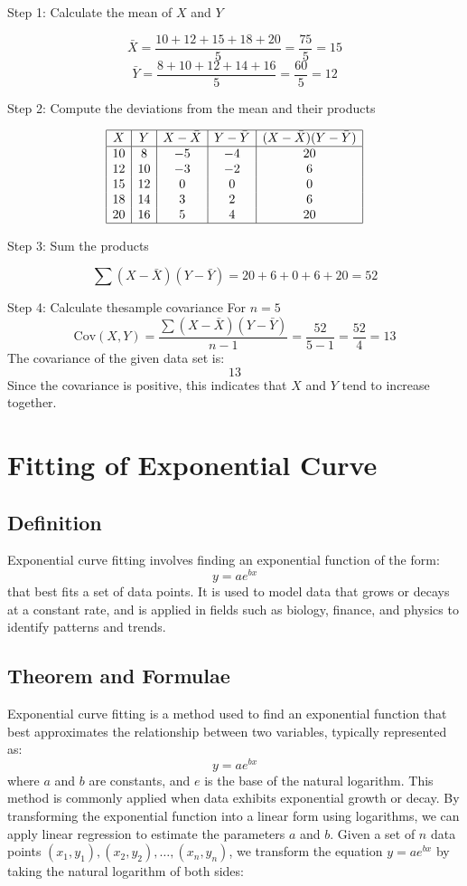 \documentclass[12pt]{article}
\begin{document}
Step 1: Calculate the mean of \(X\) and \(Y\)

\[
\bar{X} = \frac{10 + 12 + 15 + 18 + 20}{5} = \frac{75}{5} = 15
\]
\[
\bar{Y} = \frac{8 + 10 + 12 + 14 + 16}{5} = \frac{60}{5} = 12
\]

Step 2: Compute the deviations from the mean and their products

\[
\begin{array}{|c|c|c|c|c|}
\hline
X & Y & X - \bar{X} & Y - \bar{Y} & (X - \bar{X})(Y - \bar{Y}) \\
\hline
10 & 8  & -5  & -4  & 20 \\
12 & 10 & -3  & -2  & 6 \\
15 & 12 & 0   & 0   & 0 \\
18 & 14 & 3   & 2   & 6 \\
20 & 16 & 5   & 4   & 20 \\
\hline
\end{array}
\]

Step 3: Sum the products

\[
\sum (X - \bar{X})(Y - \bar{Y}) = 20 + 6 + 0 + 6 + 20 = 52
\]

Step 4: Calculate thesample covariance
For \(n = 5\)
\[
\text{Cov}(X, Y) = \frac{\sum (X - \bar{X})(Y - \bar{Y})}{n - 1} = \frac{52}{5 - 1} = \frac{52}{4} = 13
\]
The covariance of the given data set is:
\[
\boxed{13}
\]
Since the covariance is positive, this indicates that \(X\) and \(Y\) tend to increase together.

\section*{Fitting of Exponential Curve}
\subsection*{Definition}
Exponential curve fitting involves finding an exponential function of the form:
\[
y = a e^{bx}
\]
that best fits a set of data points. It is used to model data that grows or decays at a constant rate, and is applied in fields such as biology, finance, and physics to identify patterns and trends.

\subsection*{Theorem and Formulae}
Exponential curve fitting is a method used to find an exponential function that best approximates the relationship between two variables, typically represented as:
\[
y = a e^{bx}
\]
where \(a\) and \(b\) are constants, and \(e\) is the base of the natural logarithm. This method is commonly applied when data exhibits exponential growth or decay. 
By transforming the exponential function into a linear form using logarithms, we can apply linear regression to estimate the parameters \(a\) and \(b\).
Given a set of \(n\) data points \((x_1, y_1), (x_2, y_2), \ldots, (x_n, y_n)\), we transform the equation \(y = a e^{bx}\) by taking the natural logarithm of both sides:
\end{document}
